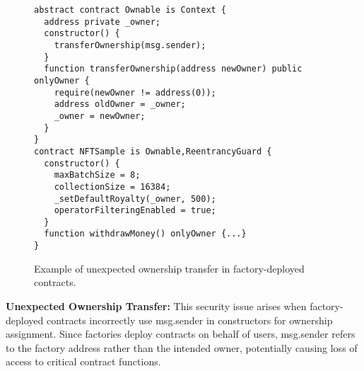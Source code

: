 \documentclass[acmsmall, screen]{acmart}
\begin{document}
	\begin{figure}[t]
		\begin{minipage}{0.95\linewidth}
			\begin{lstlisting}
abstract contract Ownable is Context {
  address private _owner;
  constructor() {
    transferOwnership(msg.sender);
  }
  function transferOwnership(address newOwner) public onlyOwner {
    require(newOwner != address(0));
    address oldOwner = _owner;
    _owner = newOwner;
  }
}
contract NFTSample is Ownable,ReentrancyGuard {
  constructor() {
    maxBatchSize = 8;
    collectionSize = 16384;
    _setDefaultRoyalty(_owner, 500);
    operatorFilteringEnabled = true;
  }
  function withdrawMoney() onlyOwner {...}
}
			\end{lstlisting}
		\end{minipage}
		\caption{Example of unexpected ownership transfer in factory-deployed contracts.}
		\label{lst:senderinconst}
	\end{figure}

	\textbf{Unexpected Ownership Transfer:} \label{sec:security-senderconst} This security issue arises
	when factory-deployed contracts incorrectly use msg.sender in constructors for ownership assignment.
	Since factories deploy contracts on behalf of users, msg.sender refers to the factory address rather
	than the intended owner, potentially causing loss of access to critical contract functions.
\end{document}

